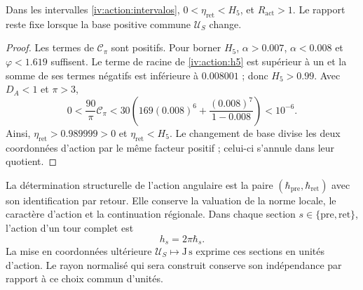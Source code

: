 \begin{proposition}
\label{iv:action:positividad}
Dans les intervalles \eqref{iv:action:intervalos},
\(0<\eta_{\mathrm{ret}}<H_5\), et \(R_{\mathrm{act}}>1\).
Le rapport reste fixe lorsque la base positive commune
\(\mathcal U_S\) change.
\end{proposition}
\begin{proof}
Les termes de \(\mathcal C_\pi\) sont positifs. Pour borner
\(H_5\), \(\alpha>0.007\), \(\alpha<0.008\) et
\(\varphi<1.619\) suffisent. Le terme de racine de \eqref{iv:action:h5}
est supérieur à un et la somme de ses termes négatifs est inférieure
à \(0.008001\) ; donc \(H_5>0.99\).
Avec \(D_A<1\) et \(\pi>3\),
\[
 0<\frac{90}{\pi}\mathcal C_\pi
 <30\left(169(0.008)^6+
             \frac{(0.008)^7}{1-0.008}\right)<10^{-6}.
\]
Ainsi, \(\eta_{\mathrm{ret}}>0.989999>0\) et
\(\eta_{\mathrm{ret}}<H_5\). Le changement de base divise les deux
coordonnées d’action par le même facteur positif ; celui-ci
s’annule dans leur quotient.

\end{proof}

La détermination structurelle de l’action angulaire est la paire
\((\hbar_{\mathrm{pre}},\hbar_{\mathrm{ret}})\) avec son
identification par retour. Elle conserve la valuation de la norme
locale, le caractère d’action et la continuation régionale.
Dans chaque section \(s\in\{\mathrm{pre},\mathrm{ret}\}\), l’action
d’un tour complet est
\begin{equation}
 h_s=2\pi\hbar_s.
 \label{iv:action:vuelta}
\end{equation}
La mise en coordonnées ultérieure \(\mathcal U_S\mapsto\mathrm{J\,s}\) exprime
ces sections en unités d’action. Le rayon normalisé qui
sera construit conserve son indépendance par rapport à ce choix
commun d’unités.
